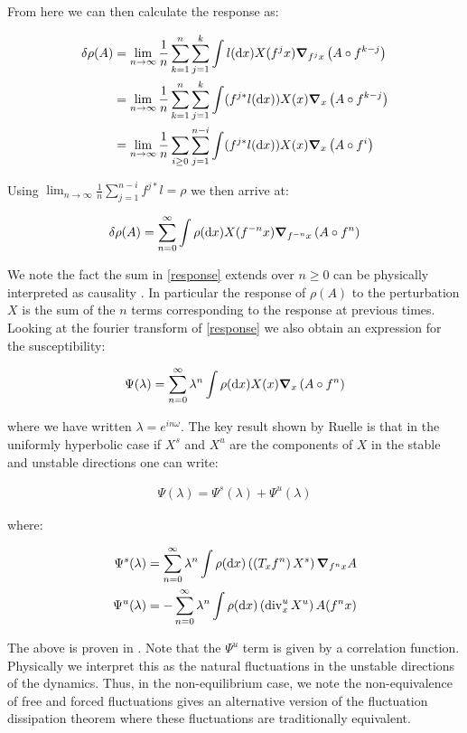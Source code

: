 \noindent From here we can then calculate the response as:

\begin{align}
\delta \rho (A) &= \lim_{n \to \infty} \frac{1}{n} \sum_{k = 1}^n \sum_{j=1}^k \int l (\dd x) X(f^j x) \grad_{f^j x} \left(A \circ f ^{k -j} \right)\\
&= \lim_{n \to \infty} \frac{1}{n} \sum_{k = 1}^n \sum_{j=1}^k \int (f^{j*} l (\dd x )) X(x) \grad_{x} \left(A \circ f ^{k -j} \right)\\ 
&= \lim_{n \to \infty} \frac{1}{n} \sum_{i \geq 0} \sum_{j=1}^{n-i} \int (f^{j*} l (\dd x )) X(x) \grad_{x} \left(A \circ f ^i \right)
\end{align}

\noindent Using $\lim_{n \to \infty} \frac{1}{n} \sum_{j=1}^{n-i} f^{j*} l = \rho$ we then arrive at:

\begin{align}
\delta \rho (A) = \sum_{n =0}^\infty \int \rho (\dd x) X(f^{-n}x) \grad_{f^{-n}x}\left(A \circ f^n \right) \label{response}
\end{align}

\noindent We note the fact the sum in \ref{response} extends over $n \geq 0$ can be physically interpreted as causality \cite{Ruelle}. In particular the response of $\rho(A)$ to the perturbation $X$ is the sum of the $n$ terms corresponding to the response at previous times. Looking at the fourier transform of \ref{response} we also obtain an expression for the susceptibility:

\begin{align}
\Psi(\lambda) = \sum_{n=0}^\infty \lambda ^n \int \rho (\dd x) X(x) \grad_x \left(A \circ f^n \right)
\end{align}

\noindent where we have written $\lambda = e^{in\omega}$. The key result shown by Ruelle is that in the uniformly hyperbolic case if $X^s$ and $X^u$ are the components of $X$ in  the stable and unstable directions one can write:

\begin{align} \label{Response Geometry}
\Psi(\lambda) = \Psi ^s(\lambda) + \Psi ^u (\lambda)
\end{align}

\noindent where:

\begin{align}
\Psi^s(\lambda) &= \sum_{n=0}^\infty \lambda^n \int \rho(\dd x) \left( \left(T_x f^n \right) X^s \right) \grad_{f^n x} A \\
\Psi^u(\lambda) &= - \sum_{n=0}^\infty \lambda^n \int \rho(\dd x) \left( \operatorname{div}_x^u X^u \right) A(f^n x)
\end{align}

\noindent The above is proven in \cite{Ruelle1997}. Note that the $\Psi^u$ term is given by a correlation function. Physically we interpret this as the natural fluctuations in the unstable directions of the dynamics. Thus, in the non-equilibrium case, we note the non-equivalence of free and forced fluctuations gives an alternative version of the fluctuation dissipation theorem where these fluctuations are traditionally equivalent.
